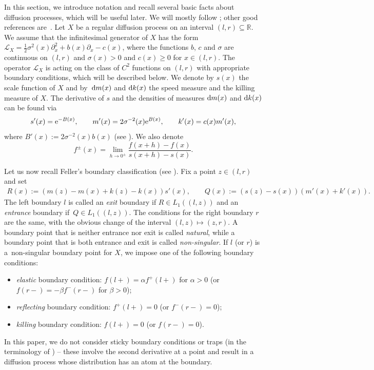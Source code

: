 \documentclass[pdftex]{sigma}
\numberwithin{equation}{section}
\theoremstyle{definition}
\def\r{{\mathbb R}}
\def\d{{\textnormal d}}
\begin{document}
In this section, we introduce notation and recall several basic facts about diffusion processes, which will be useful later. We will mostly follow \cite[Chapter II]{Borodin2002}; other good references are~\cite{ItoMcKean_1974,Mandl1968}.
Let $X$ be a regular diffusion process on an interval $(l,r)\subseteq \r$. We assume that the infinitesimal generator of $X$ has the form
$
{\mathcal L}_X=\frac{1}{2} \sigma^2(x) \partial_x^2 + b(x) \partial_x - c(x)$,
where the functions $b$, $c$ and $\sigma$ are continuous on $(l,r)$ and $\sigma(x)>0$ and $c(x)\ge 0$ for $x\in (l,r)$.
The operator ${\mathcal L}_X$ is acting on the class of $C^2$ functions on $(l, r)$ with appropriate boundary conditions, which will be described below. We denote by $s(x)$ the scale function of $X$ and by~$\d m(x)$ and $\d k(x)$ the speed measure and the killing measure of $X$. The derivative of $s$ and the densities of measures $\d m(x)$ and $\d k(x)$ can be found via
\begin{equation}\label{eqn:s_m_k_prime}
s'(x)={\rm e}^{-B(x)}, \qquad m'(x)=2\sigma^{-2}(x) {\rm e}^{B(x)}, \qquad k'(x)=c(x) m'(x),
\end{equation}
where $B'(x):=2 \sigma^{-2}(x) b(x)$ (see \cite[Section II.9]{Borodin2002}).
We also denote
\[
f^{\pm}(x)=\lim\limits_{h\to 0^{\pm}} \frac{f(x+h)-f(x)}{s(x+h)-s(x)}.
\]

Let us now recall Feller's boundary classification (see \cite[Section II.6]{Borodin2002}). Fix a point $z\in (l,r)$ and set
\begin{gather}\label{def:R_Q}
R(x):=(m(z)-m(x)+k(z)-k(x)) s'(x), \!\qquad Q(x):=(s(z)-s(x)) (m'(x)+k'(x)).\!\!\!
\end{gather}
The left boundary $l$ is called an {\it exit} boundary if $R\in L_1((l,z))$ and an {\it entrance} boundary if~${Q \in L_1((l,z))}$. \label{R_Q_L1} The conditions for the right boundary $r$ are the same, with the obvious change of the interval $(l,z) \mapsto (z,r)$. A boundary point that is neither entrance nor exit is called {\it natural}, while a boundary point that is both entrance and exit is called {\it non-singular}. If $l$ (or $r$) is a~non-singular boundary point for $X$, we impose one of the following boundary conditions:
\label{elastic_boundary_condition}
\begin{itemize}\itemsep=0pt
\item[(i)] {\it elastic} boundary condition: $f(l+)=\alpha f^+(l+)$ for $\alpha >0 $ (or $f(r-)=-\beta f^-(r-)$ for $\beta > 0$);
\item[(ii)] {\it reflecting} boundary condition: $f^+(l+)=0$ (or $f^-(r-)=0$);
\item[(iii)] {\it killing} boundary condition: $f(l+)=0$ (or $f(r-)=0$).
\end{itemize}
In this paper, we do not consider sticky boundary conditions or traps (in the terminology of \cite[Section II.7]{Borodin2002}) -- these involve the second derivative at a point and result in a diffusion process whose distribution has an atom at the boundary.
\end{document}
